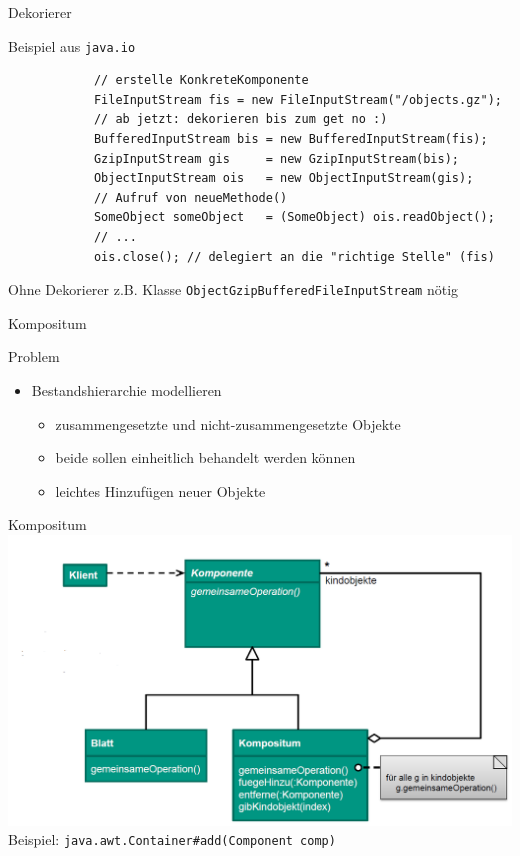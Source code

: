 \documentclass[18pt]{beamer}
\begin{document}
	\begin{frame}[fragile]{Dekorierer}
		\begin{exampleblock}{Beispiel aus \texttt{java.io}}
			\begin{verbatim}
			// erstelle KonkreteKomponente
			FileInputStream fis = new FileInputStream("/objects.gz");
			// ab jetzt: dekorieren bis zum get no :)
			BufferedInputStream bis = new BufferedInputStream(fis);
			GzipInputStream gis     = new GzipInputStream(bis);
			ObjectInputStream ois   = new ObjectInputStream(gis);
			// Aufruf von neueMethode()
			SomeObject someObject   = (SomeObject) ois.readObject();
			// ...
			ois.close(); // delegiert an die "richtige Stelle" (fis)
			\end{verbatim}
		\end{exampleblock}
		\pause
		\begin{alertblock}{Ohne Dekorierer}
			z.B. Klasse \texttt{ObjectGzipBufferedFileInputStream} nötig
		\end{alertblock}
	\end{frame}

	\begin{frame}{Kompositum}
		\begin{block}{Problem}
			\begin{itemize}
				\item Bestandshierarchie modellieren
				\begin{itemize}
					\item zusammengesetzte und nicht-zusammengesetzte Objekte
					\item beide sollen einheitlich behandelt werden können
					\item leichtes Hinzufügen neuer Objekte
				\end{itemize}
			\end{itemize}
		\end{block}
	\end{frame}

	\begin{frame}{Kompositum}
		\includegraphics[scale=0.35]{./pics/tut4/comp.png}
		\pause
		Beispiel: \texttt{java.awt.Container\#add(Component comp)}
	\end{frame}
\end{document}
